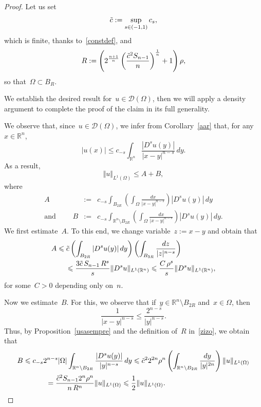 \documentclass[11pt,hyp,]{nyjm}
\numberwithin{equation}{section}
\newcommand{\R}{\mathbb{R}}
\theoremstyle{remark}
\newcommand{\Int}{\int_{\mathbb{R}^n}}
\renewcommand{\leq}{\leqslant}
\begin{document}
		\begin{proof}
		
		Let us set
			\begin{equation*}
				\Tilde{c}:= \sup_{s \in(-1,1)} c_{s},
			\end{equation*}		
			which is finite, thanks to~\eqref{constdef}, and 
		\begin{equation}\label{zizo}
R:= \left(  2^{\frac{n+1}{n}} \left(\frac{{\Tilde{c}}^2 S_{n-1}}{n}\right)^{\frac{1}{	n}} +1 \right)  {\rho},
\end{equation}	
			so that~$\Omega \subset B_{R}$.
			
			We establish the desired result for~$u \in \mathcal{D}(\Omega)$, then we will apply a density argument to complete the proof of the claim in its full generality. 		
			
We observe that, since~$u \in \mathcal{D}(\Omega)$, we infer from Corollary~\ref{aar} that, for any~$x \in \R^n$,
			\[ |u(x)| \leq c_{-s} \Int \frac{|D^s u(y)|}{|x-y|^{n-s}} \, dy. \] 
As a result, 
\begin{equation}\label{col}
\Vert u \Vert_{L^1(\Omega)} \leq A + B,
\end{equation}
		where
		\begin{eqnarray*}A&:=& c_{-s} \int_{B_{2R}}\left(\int_{\Omega}\frac{dx}{|x-y|^{n-s}}  \right)|D^s u(y)| \, dy 		\\
{\mbox{and }}\qquad 
	B&:=& c_{-s} \int_{\R^n \setminus B_{2R}}  \left( \int_{\Omega}\frac{dx}{|x-y|^{n-s}} \right) |D^s u(y)| \, dy.	\end{eqnarray*}
We first estimate~$A$. To this end, we change variable~$z:=x-y$ and obtain that
			\begin{equation}\label{098}\begin{split}&
				A \leq \Tilde{c} \left(\int_{B_{2R}}|D^s u(y)| \, dy\right) \left(\int_{B_{3R}}\frac{dz}{|z|^{n-s}} \right)\\&\qquad \leq \frac{3\Tilde{c}\, S_{n-1}\,{R}^s}{s} \Vert D^s u \Vert_{L^1(\R^n)} \leq \frac{C\, \rho^s}{s} \Vert D^s u \Vert_{L^1(\R^n)},\end{split}
			\end{equation} for some~$C>0$ depending only on~$n$.
			
Now we estimate~$B$. For this, we observe that if~$y \in \R^n \setminus B_{2R}$ and~$x \in \Omega$, then
\begin{equation*}
\frac{1}{|x-y|^{n-s} } \leq \frac{2^{n-s}}{|y|^{n-s}}.
\end{equation*}
Thus, by Proposition~\ref{usasempre} and the definition of~$R$ in~\eqref{zizo}, we obtain that
\begin{align*}&
B \leq c_{-s} 2^{n-s}|\Omega| \int_{\R^n \setminus	B_{2R}} \frac{|D^su(y)|}{|y|^{n-s}} \, dy \leq  {\Tilde{c}}^2 2^{2n} \rho^n \left( \int_{\R^n \setminus B_{2R}}\frac{dy}{|y|^{2n}}  \right) \Vert u \Vert_{L^1(\Omega)} \\&\qquad\qquad= \frac{{\Tilde{c}}^2 S_{n-1} 2^{n} \rho^n}{n\,R^n}  \Vert u \Vert_{L^1(\Omega)} \leq \frac{1}{2} \Vert u \Vert_{L^1(\Omega)}.
\end{align*}


\end{proof}
\end{document}
